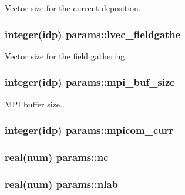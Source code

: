 Vector size for the current deposition. 

\subsubsection[{\texorpdfstring{lvec\+\_\+fieldgathe}{lvec_fieldgathe}}]{\setlength{\rightskip}{0pt plus 5cm}integer(idp) params\+::lvec\+\_\+fieldgathe}\hypertarget{namespaceparams_acb2db26088c715aabd2ca6722e0bcdc6}{}\label{namespaceparams_acb2db26088c715aabd2ca6722e0bcdc6}


Vector size for the field gathering. 

\subsubsection[{\texorpdfstring{mpi\+\_\+buf\+\_\+size}{mpi_buf_size}}]{\setlength{\rightskip}{0pt plus 5cm}integer(idp) params\+::mpi\+\_\+buf\+\_\+size}\hypertarget{namespaceparams_a130afa667477bbefb53f06c15b86d2e1}{}\label{namespaceparams_a130afa667477bbefb53f06c15b86d2e1}


M\+PI buffer size. 

\subsubsection[{\texorpdfstring{mpicom\+\_\+curr}{mpicom_curr}}]{\setlength{\rightskip}{0pt plus 5cm}integer(idp) params\+::mpicom\+\_\+curr}\hypertarget{namespaceparams_a5e7c931ca55f3ac5e5171dc97c3269b1}{}\label{namespaceparams_a5e7c931ca55f3ac5e5171dc97c3269b1}
\subsubsection[{\texorpdfstring{nc}{nc}}]{\setlength{\rightskip}{0pt plus 5cm}real(num) params\+::nc}\hypertarget{namespaceparams_adb7d5f7cb5d7431bdf0e5a8ea5b1ad56}{}\label{namespaceparams_adb7d5f7cb5d7431bdf0e5a8ea5b1ad56}
\subsubsection[{\texorpdfstring{nlab}{nlab}}]{\setlength{\rightskip}{0pt plus 5cm}real(num) params\+::nlab}\hypertarget{namespaceparams_a977c294dda0d117791fd0e6f7c9bdad5}{}\label{namespaceparams_a977c294dda0d117791fd0e6f7c9bdad5}
